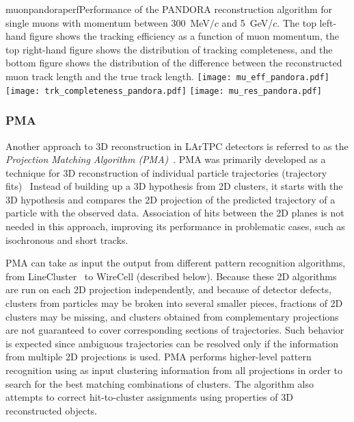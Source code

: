 \begin{cdrfigure}{muonpandoraperf}{Performance of the PANDORA reconstruction algorithm for single muons with 
momentum between 300~MeV$/c$ and 5~GeV/$c$.  The top left-hand figure shows the tracking efficiency as a function of
muon momentum, the top right-hand figure shows the distribution of tracking completeness, and the bottom figure shows the
distribution of the difference between the reconstructed muon track length and the true track length.}
\texttt{[image: mu\_eff\_pandora.pdf]}
\texttt{[image: trk\_completeness\_pandora.pdf]}
\texttt{[image: mu\_res\_pandora.pdf]}
\end{cdrfigure}


\subsubsection{PMA}

Another approach to 3D reconstruction in LArTPC detectors is referred to as the \textit{Projection Matching Algorithm
(PMA)}~\cite{pma_algorithm}. PMA was primarily developed as a technique for 3D reconstruction
of individual particle trajectories (trajectory fits)~\cite{pma_algorithm} %
Instead of
building up a 3D hypothesis from 2D clusters, it starts with the 3D hypothesis and compares
the 2D projection of the predicted trajectory of a particle with the observed data. Association
of hits between the 2D planes is not needed in this approach, improving its performance in
problematic cases, such as isochronous and short tracks.

PMA can take as input the output from different pattern recognition algorithms, from
LineCluster~\cite{linecluster} to WireCell (described below).  Because these 2D algorithms
are run on each 2D projection independently, and because of detector defects,
clusters from  particles may be broken
into several smaller pieces, fractions of 2D clusters may be missing,
and clusters obtained from complementary projections are not guaranteed to cover corresponding
sections of trajectories. Such behavior is expected since ambiguous 
trajectories can be resolved only if the information from multiple 2D projections is used.
PMA performs higher-level pattern recognition using as input clustering information from all
projections in order to search for the best matching combinations of clusters. The algorithm
also attempts to correct hit-to-cluster assignments using properties of 3D reconstructed objects.

